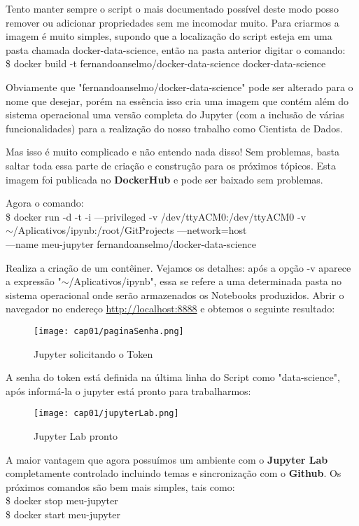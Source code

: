 Tento manter sempre o script o mais documentado possível deste modo posso remover ou adicionar propriedades sem me incomodar muito. Para criarmos a imagem é muito simples, supondo que a localização do script esteja em uma pasta chamada docker-data-science, então na pasta anterior digitar o comando: \\
{\ttfamily\$ docker build -t fernandoanselmo/docker-data-science docker-data-science}

Obviamente que "fernandoanselmo/docker-data-science" pode ser alterado para o nome que desejar, porém na essência isso cria uma imagem que contém além do sistema operacional uma versão completa do Jupyter (com a inclusão de várias funcionalidades) para a realização do nosso trabalho como Cientista de Dados. 

\begin{note}[Socorro]{}
	Mas isso é muito complicado e não entendo nada disso! Sem problemas, basta saltar toda essa parte de criação e construção para os próximos tópicos. Esta imagem foi publicada no \textbf{DockerHub} e pode ser baixado sem problemas.
\end{note}

Agora o comando: \\
{\ttfamily\$ docker run -d -t -i ---privileged -v /dev/ttyACM0:/dev/ttyACM0 -v \\ $\sim$/Aplicativos/ipynb:/root/GitProjects ---network=host \\
	 ---name meu-jupyter fernandoanselmo/docker-data-science}
 
Realiza a criação de um contêiner. Vejamos os detalhes: após a opção -v aparece a expressão "$\sim$/Aplicativos/ipynb", essa se refere a uma determinada pasta no sistema operacional onde serão armazenados os Notebooks produzidos. Abrir o navegador no endereço \url{http://localhost:8888} e obtemos o seguinte resultado:
\begin{figure}[H]
	\centering\texttt{[image: cap01/paginaSenha.png]}
	\caption{Jupyter solicitando o Token}
\end{figure}

A senha do token está definida na última linha do Script como "data-science", após informá-la o jupyter está pronto para trabalharmos:
\begin{figure}[H]
	\centering\texttt{[image: cap01/jupyterLab.png]}
	\caption{Jupyter Lab pronto}
\end{figure}

A maior vantagem que agora possuímos um ambiente com o \textbf{Jupyter Lab} completamente controlado incluindo temas e sincronização com o \textbf{Github}. Os próximos comandos são bem mais simples, tais como: \\
{\ttfamily\$ docker stop meu-jupyter} \\
{\ttfamily\$ docker start meu-jupyter}

